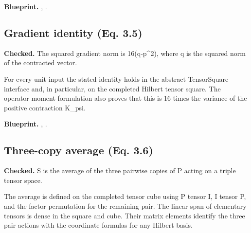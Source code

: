 \textbf{Blueprint.} , .

\subsection{Gradient identity (Eq. 3.5)}\label{paper:gradient-norm}
\textbf{Checked.} The squared gradient norm is 16(q-p\textasciicircum{}2), where q is the squared norm of the contracted vector. 

For every unit input the stated identity holds in the abstract TensorSquare interface and, in particular, on the completed Hilbert tensor square. The operator-moment formulation also proves that this is 16 times the variance of the positive contraction K\_psi.


\textbf{Blueprint.} , .

\subsection{Three-copy average (Eq. 3.6)}\label{paper:three-copy}
\textbf{Checked.} S is the average of the three pairwise copies of P acting on a triple tensor space. 

The average is defined on the completed tensor cube using P tensor I, I tensor P, and the factor permutation for the remaining pair. The linear span of elementary tensors is dense in the square and cube. Their matrix elements identify the three pair actions with the coordinate formulas for any Hilbert basis.

